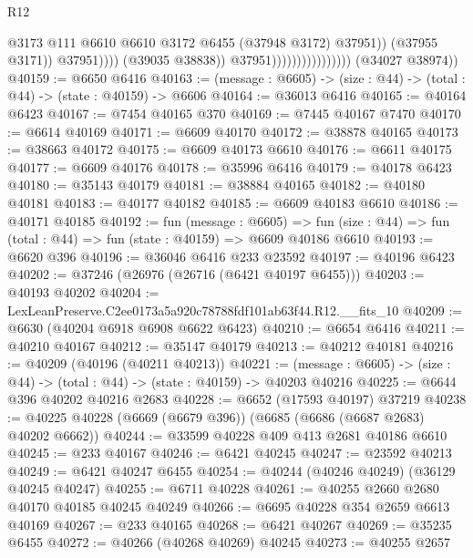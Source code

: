 \begin{lexlean}{R12}
\begin{coremodule}
                                                      @3173
                                                      @111
                                                      @6610
                                                      @6610
                                                      @3172
                                                      @6455
                                                      (@37948 @3172)
                                                      @37951))
                                                  (@37955 @3171))
                                                @37951))))
                                        (@39035 @38838))
                                      @37951))))))))))))))))
      (@34027 @38974))
@40159 := @6650 @6416
@40163 := (message : @6605) -> (size : @44) -> (total : @44) -> (state : @40159) -> @6606
@40164 := @36013 @6416
@40165 := @40164 @6423
@40167 := @7454 @40165 @370
@40169 := @7445 @40167 @7470
@40170 := @6614 @40169
@40171 := @6609 @40170
@40172 := @38878 @40165
@40173 := @38663 @40172
@40175 := @6609 @40173 @6610
@40176 := @6611 @40175
@40177 := @6609 @40176
@40178 := @35996 @6416
@40179 := @40178 @6423
@40180 := @35143 @40179
@40181 := @38884 @40165
@40182 := @40180 @40181
@40183 := @40177 @40182
@40185 := @6609 @40183 @6610
@40186 := @40171 @40185
@40192 := fun (message : @6605) =>
  fun (size : @44) => fun (total : @44) => fun (state : @40159) => @6609 @40186 @6610
@40193 := @6620 @396
@40196 := @36046 @6416 @233 @23592
@40197 := @40196 @6423
@40202 := @37246 (@26976 (@26716 (@6421 @40197 @6455)))
@40203 := @40193 @40202
@40204 := LexLeanPreserve.C2ee0173a5a920c78788fdf101ab63f44.R12.__fits_10
@40209 := @6630 (@40204 @6918 @6908 @6622 @6423)
@40210 := @6654 @6416
@40211 := @40210 @40167
@40212 := @35147 @40179
@40213 := @40212 @40181
@40216 := @40209 (@40196 (@40211 @40213))
@40221 := (message : @6605) -> (size : @44) -> (total : @44) -> (state : @40159) -> @40203 @40216
@40225 := @6644 @396 @40202 @40216 @2683
@40228 := @6652 (@17593 @40197) @37219
@40238 := @40225 @40228 (@6669 (@6679 @396)) (@6685 (@6686 (@6687 @2683) @40202 @6662))
@40244 := @33599 @40228 @409 @413 @2681 @40186 @6610
@40245 := @233 @40167
@40246 := @6421 @40245
@40247 := @23592 @40213
@40249 := @6421 @40247 @6455
@40254 := @40244 (@40246 @40249) (@36129 @40245 @40247)
@40255 := @6711 @40228
@40261 := @40255 @2660 @2680 @40170 @40185 @40245 @40249
@40266 := @6695 @40228 @354 @2659 @6613 @40169
@40267 := @233 @40165
@40268 := @6421 @40267
@40269 := @35235 @6455
@40272 := @40266 (@40268 @40269) @40245
@40273 := @40255 @2657

\end{coremodule}
\end{lexlean}
